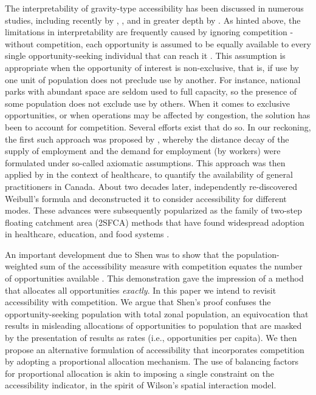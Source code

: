 \documentclass[]{elsarticle} %
\begin{document}
The interpretability of gravity-type accessibility has been discussed in
numerous studies, including recently by \citet{hu_2019_measuring},
\citet{kelobonye2020measuring}, and in greater depth by
\citet{merlin2017competition}. As hinted above, the limitations in
interpretability are frequently caused by ignoring competition - without
competition, each opportunity is assumed to be equally available to
every single opportunity-seeking individual that can reach it
\citep{shen1998, paez2019, kelobonye2020measuring}. This assumption is
appropriate when the opportunity of interest is non-exclusive, that is,
if use by one unit of population does not preclude use by another. For
instance, national parks with abundant space are seldom used to full
capacity, so the presence of some population does not exclude use by
others. When it comes to exclusive opportunities, or when operations may
be affected by congestion, the solution has been to account for
competition. Several efforts exist that do so. In our reckoning, the
first such approach was proposed by \citet{weibull_axiomatic_1976},
whereby the distance decay of the supply of employment and the demand
for employment (by workers) were formulated under so-called axiomatic
assumptions. This approach was then applied by \citet{joseph1984} in the
context of healthcare, to quantify the availability of general
practitioners in Canada. About two decades later, \citet{shen1998}
independently re-discovered Weibull's
\citeyearpar{weibull_axiomatic_1976} formula \citep[see footnote (7)
in][]{shen1998} and deconstructed it to consider accessibility for
different modes. These advances were subsequently popularized as the
family of two-step floating catchment area (2SFCA) methods
\citep{luo2003} that have found widespread adoption in healthcare,
education, and food systems
\citep{yang_comparing_2006, chen_spatial_2020, ye_spatial_2018, chen_enhancing_2019, chen_evaluating_2020}.

An important development due to Shen was to show that the
population-weighted sum of the accessibility measure with competition
equates the number of opportunities available \citep[footnote (7) and
Appendix A in][]{shen1998}. This demonstration gave the impression of a
method that allocates all opportunities \emph{exactly}. In this paper we
intend to revisit accessibility with competition. We argue that Shen's
proof confuses the opportunity-seeking population with total zonal
population, an equivocation that results in misleading allocations of
opportunities to population that are masked by the presentation of
results as rates (i.e., opportunities per capita). We then propose an
alternative formulation of accessibility that incorporates competition
by adopting a proportional allocation mechanism. The use of balancing
factors for proportional allocation is akin to imposing a single
constraint on the accessibility indicator, in the spirit of Wilson's
\citeyearpar{wilson1971} spatial interaction model.
\end{document}

